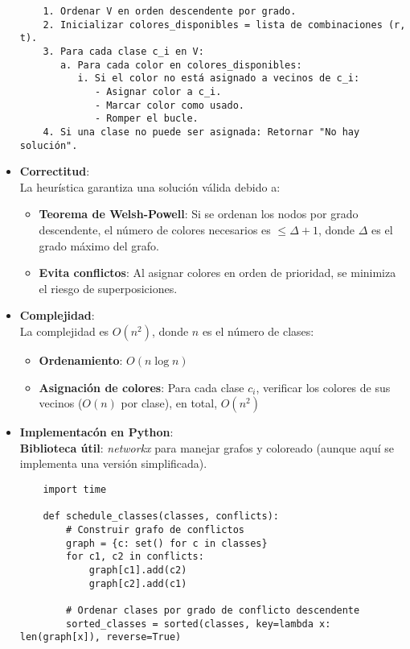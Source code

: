 \documentclass[12pt, a4paper]{article}
\begin{document}
\begin{itemize}
\begin{verbatim}
    1. Ordenar V en orden descendente por grado.
    2. Inicializar colores_disponibles = lista de combinaciones (r, t).
    3. Para cada clase c_i en V:
       a. Para cada color en colores_disponibles:
          i. Si el color no está asignado a vecinos de c_i:
             - Asignar color a c_i.
             - Marcar color como usado.
             - Romper el bucle.
    4. Si una clase no puede ser asignada: Retornar "No hay solución".
    \end{verbatim}
    \item \textbf{Correctitud}:\\
    La heurística garantiza una solución válida debido a:
    \begin{itemize}
        \item \textbf{Teorema de Welsh-Powell}: Si se ordenan los nodos por grado descendente, el número de colores necesarios es $\leq \Delta + 1$, donde $\Delta$ es el grado máximo del grafo.
        \item \textbf{Evita conflictos}: Al asignar colores en orden de prioridad, se minimiza el riesgo de superposiciones.
    \end{itemize}
    \item \textbf{Complejidad}:\\
    La complejidad es \( O(n^2) \), donde $n$ es el número de clases:
    \begin{itemize}
        \item \textbf{Ordenamiento}: $O(n\log n)$
        \item \textbf{Asignación de colores}: Para cada clase $c_i$, verificar los colores de sus vecinos ($O(n)$ por clase), en total, $O(n^2)$
    \end{itemize}
    \item \textbf{Implementacón en Python}:\\
    \textbf{Biblioteca útil}: \textit{networkx} para manejar grafos y coloreado (aunque aquí se implementa una versión simplificada).
    \begin{verbatim}
    import time
    
    def schedule_classes(classes, conflicts):
        # Construir grafo de conflictos
        graph = {c: set() for c in classes}
        for c1, c2 in conflicts:
            graph[c1].add(c2)
            graph[c2].add(c1)
        
        # Ordenar clases por grado de conflicto descendente
        sorted_classes = sorted(classes, key=lambda x: len(graph[x]), reverse=True)
        

\end{verbatim}
\end{itemize}
\end{document}
